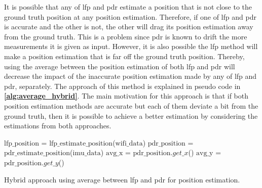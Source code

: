 It is possible that any of \gls{lfp} and \gls{pdr} estimate a position that is not close to the ground truth position at any position estimation. Therefore, if one of \gls{lfp} and \gls{pdr} is accurate and the other is not, the other will drag its position estimation away from the ground truth. This is a problem since \gls{pdr} is known to drift the more measurements it is given as input. However, it is also possible the \gls{lfp} method will make a position estimation that is far off the ground truth position.
Thereby, using the average between the position estimation of both \gls{lfp} and \gls{pdr} will decrease the impact of the inaccurate position estimation made by any of \gls{lfp} and \gls{pdr}, separately. The approach of this method is explained in pseudo code in \textbf{\autoref{alg:average_hybrid}}.
The main motivation for this approach is that if both position estimation methods are accurate but each of them deviate a bit from the ground truth, then it is possible to achieve a better estimation by considering the estimations from both approaches.

\begin{algorithm}[H]
\SetAlgoLined
{}
 $\text{lfp\_position}$ = $\text{lfp\_estimate\_position}$($\text{wifi\_data}$)\;
 $\text{pdr\_position}$ = $\text{pdr\_estimate\_position}$($\text{imu\_data}$)\;
 $\text{avg\_x}$ = $\text{pdr\_position}.get\_x$()\;
 $\text{avg\_y}$ = $\text{pdr\_position}.get\_y$()\;
 
 \caption{Hybrid approach using average between \gls{lfp} and \gls{pdr} for position estimation.}
 \label{alg:average_hybrid}
\end{algorithm}